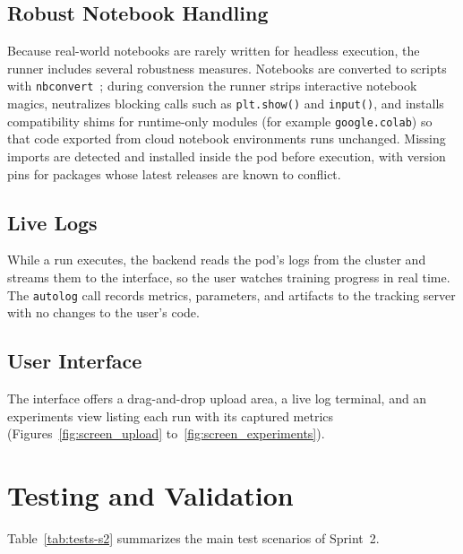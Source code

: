 \subsection{Robust Notebook Handling}
Because real-world notebooks are rarely written for headless execution, the
runner includes several robustness measures. Notebooks are converted to scripts
with \texttt{nbconvert}~\cite{nbconvert_docs}; during conversion the runner
strips interactive notebook magics, neutralizes blocking calls such as
\texttt{plt.show()} and \texttt{input()}, and installs compatibility shims for
runtime-only modules (for example \texttt{google.colab}) so that code exported
from cloud notebook environments runs unchanged. Missing imports are detected and
installed inside the pod before execution, with version pins for packages whose
latest releases are known to conflict.

\subsection{Live Logs}
While a run executes, the backend reads the pod's logs from the cluster and streams
them to the interface, so the user watches training progress in real time. The
\texttt{autolog} call records metrics, parameters, and artifacts to the tracking
server with no changes to the user's code.

\subsection{User Interface}
The interface offers a drag-and-drop upload area, a live log terminal, and an
experiments view listing each run with its captured metrics
(Figures~\ref{fig:screen_upload} to~\ref{fig:screen_experiments}).

\section{Testing and Validation}
Table~\ref{tab:tests-s2} summarizes the main test scenarios of Sprint~2.

